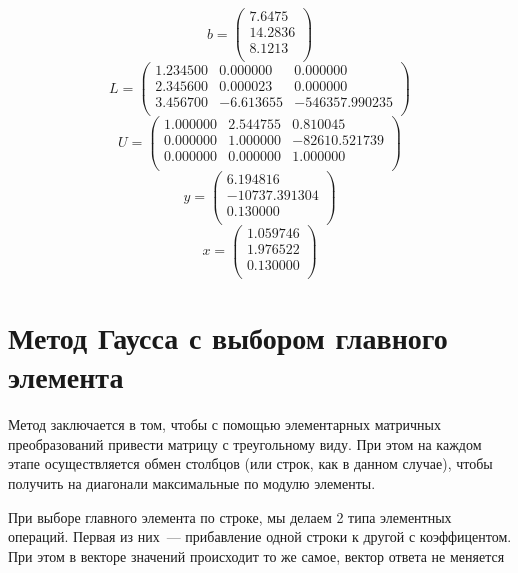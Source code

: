 \documentclass[11pt,a4paper,oneside]{article}
\begin{document}
$$ b = \left(\begin{matrix}
	7.6475 \\
	14.2836 \\
	8.1213 \\
\end{matrix}\right) $$
$$L=\left(\begin{matrix} 1.234500 & 0.000000 & 0.000000\\ 2.345600 & 0.000023 & 0.000000\\ 3.456700 & -6.613655 & -546357.990235\\ \end{matrix}\right)$$
$$U=\left(\begin{matrix} 1.000000 & 2.544755 & 0.810045\\ 0.000000 & 1.000000 & -82610.521739\\ 0.000000 & 0.000000 & 1.000000\\ \end{matrix}\right)$$
$$y=\left(\begin{matrix} 6.194816\\ -10737.391304\\ 0.130000\\ \end{matrix}\right)$$
$$x=\left(\begin{matrix} 1.059746\\ 1.976522\\ 0.130000\\ \end{matrix}\right)$$

\section{Метод Гаусса с выбором главного элемента}

Метод заключается в том, чтобы с помощью элементарных матричных преобразований привести матрицу с треугольному виду. При этом на каждом этапе осуществляется обмен столбцов (или строк, как в данном случае), чтобы получить на диагонали максимальные по модулю элементы.

При выборе главного элемента по строке, мы делаем 2 типа элементных операций. Первая из них~--- прибавление одной строки к другой с коэффицентом. При этом в векторе значений происходит то же самое, вектор ответа не меняется
\end{document}
